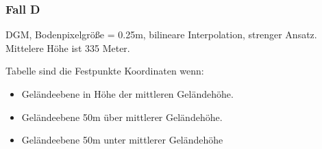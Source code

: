 \documentclass[12pt]{article}
\begin{document}
\subsubsection{Fall D}
DGM, Bodenpixelgröße = 0.25m, bilineare Interpolation, strenger Ansatz. Mittelere Höhe ist 335 Meter.
\begin{figure}[ht]\centering
\end{figure}
\newline
Tabelle sind die Festpunkte Koordinaten wenn: 
\begin{itemize}
\item Geländeebene in Höhe der mittleren Geländehöhe.
\item Geländeebene 50m über mittlerer Geländehöhe.
\item Geländeebene 50m unter mittlerer Geländehöhe
\end{itemize}
\end{document}

